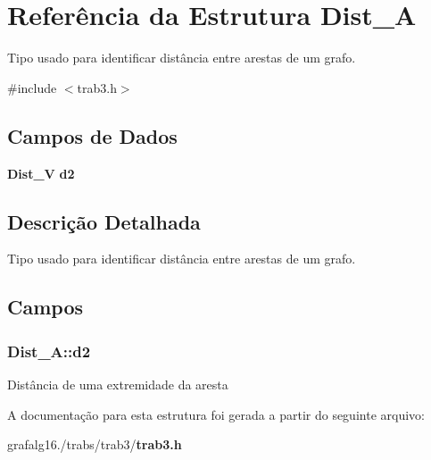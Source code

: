 \section{Referência da Estrutura Dist\+\_\+A}
\label{structDist__A}


Tipo usado para identificar distância entre arestas de um grafo.  




{\ttfamily \#include $<$trab3.\+h$>$}

\subsection*{Campos de Dados}
\begin{DoxyCompactItemize}
\item 
{\bf Dist\+\_\+V} {\bf d2}
\end{DoxyCompactItemize}


\subsection{Descrição Detalhada}
Tipo usado para identificar distância entre arestas de um grafo. 

\subsection{Campos}
\subsubsection[{d2}]{ Dist\+\_\+\+A\+::d2}\label{structDist__A_aaca6abb3f1e88d78c23ef05b80c5ad99}
Distância de uma extremidade da aresta 

A documentação para esta estrutura foi gerada a partir do seguinte arquivo\+:\begin{DoxyCompactItemize}
\item 
grafalg16./trabs/trab3/{\bf trab3.\+h}\end{DoxyCompactItemize}
